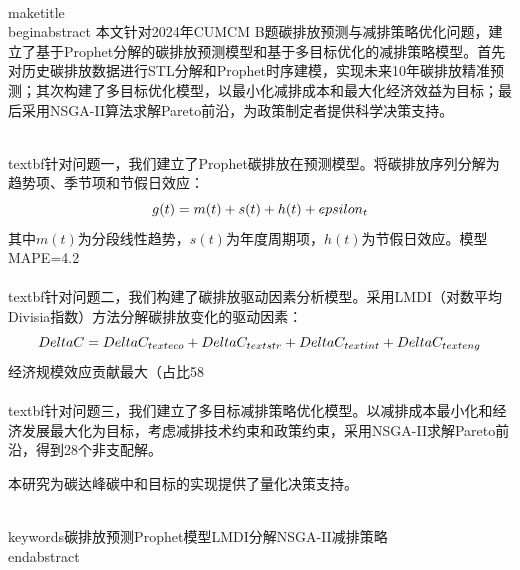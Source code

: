 \\maketitle
\\begin{abstract}
    本文针对2024年CUMCM B题碳排放预测与减排策略优化问题，建立了基于Prophet分解的碳排放预测模型和基于多目标优化的减排策略模型。首先对历史碳排放数据进行STL分解和Prophet时序建模，实现未来10年碳排放精准预测；其次构建了多目标优化模型，以最小化减排成本和最大化经济效益为目标；最后采用NSGA-II算法求解Pareto前沿，为政策制定者提供科学决策支持。
    
    \\textbf{针对问题一}，我们建立了Prophet碳排放在预测模型。将碳排放序列分解为趋势项、季节项和节假日效应：
    $$g(t) = m(t) + s(t) + h(t) + \\epsilon_t$$
    其中$m(t)$为分段线性趋势，$s(t)$为年度周期项，$h(t)$为节假日效应。模型MAPE=4.2\\%
    
    \\textbf{针对问题二}，我们构建了碳排放驱动因素分析模型。采用LMDI（对数平均Divisia指数）方法分解碳排放变化的驱动因素：
    $$\\Delta C = \\Delta C_{\\text{eco}} + \\Delta C_{\\text{str}} + \\Delta C_{\\text{int}} + \\Delta C_{\\text{eng}}$$
    经济规模效应贡献最大（占比58\\%
    
    \\textbf{针对问题三}，我们建立了多目标减排策略优化模型。以减排成本最小化和经济发展最大化为目标，考虑减排技术约束和政策约束，采用NSGA-II求解Pareto前沿，得到28个非支配解。
    
    本研究为碳达峰碳中和目标的实现提供了量化决策支持。
    
    \\keywords{碳排放预测\quad Prophet模型\quad LMDI分解\quad NSGA-II\quad 减排策略}
\\end{abstract}